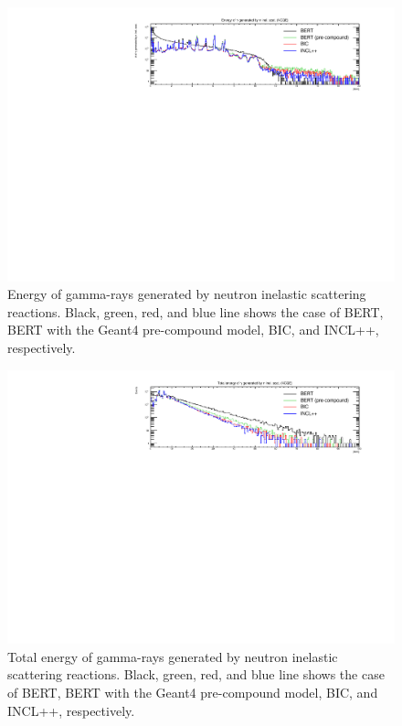 \begin{figure}[h]
	\centering
	\includegraphics[width=16cm]{PDF/Secondary/Comparison_PreCompound/onlyNCQE_gamma/pdf1/Logy_EneSec}
	\caption[Energy of gamma-rays generated by neutron inelastic scattering reactions]{
	Energy of gamma-rays generated by neutron inelastic scattering reactions.
	Black, green, red, and blue line shows the case of BERT, BERT with the Geant4 pre-compound model, BIC, and INCL++, respectively.
	}\label{Pre_gamma_Logy_EneSec}
\end{figure}

\begin{figure}[h]
	\centering
	\includegraphics[width=16cm]{PDF/Secondary/Comparison_PreCompound/onlyNCQE_gamma/pdf1/Logy_TotEneSec}
	\caption[Total energy of gamma-rays generated by neutron inelastic scattering reactions]{
	Total energy of gamma-rays generated by neutron inelastic scattering reactions.
	Black, green, red, and blue line shows the case of BERT, BERT with the Geant4 pre-compound model, BIC, and INCL++, respectively.
	}\label{Pre_gamma_Logy_TotEneSec}
\end{figure}

